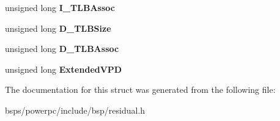 \begin{DoxyCompactItemize}
\item 
\mbox{\label{struct__VPD_a3c5053e6c3f89938cfd8d1d4cbcdd618}} 
unsigned long {\bfseries I\+\_\+\+T\+L\+B\+Assoc}
\item 
\mbox{\label{struct__VPD_a8daccd9c0ab6a23e07145737ae370454}} 
unsigned long {\bfseries D\+\_\+\+T\+L\+B\+Size}
\item 
\mbox{\label{struct__VPD_aec487dc53dc3765c2d755ea565268ebd}} 
unsigned long {\bfseries D\+\_\+\+T\+L\+B\+Assoc}
\item 
\mbox{\label{struct__VPD_a2c163c7e032c6538ab5d642be238d891}} 
unsigned long {\bfseries Extended\+V\+PD}
\end{DoxyCompactItemize}


The documentation for this struct was generated from the following file\+:\begin{DoxyCompactItemize}
\item 
bsps/powerpc/include/bsp/residual.\+h\end{DoxyCompactItemize}
